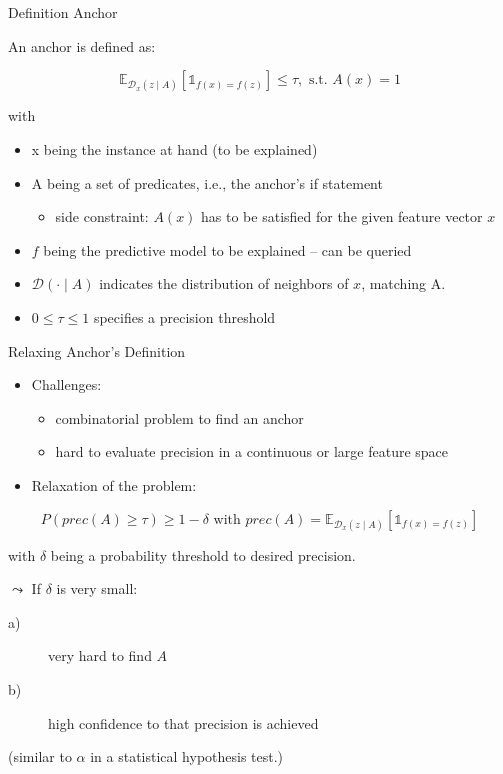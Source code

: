 \documentclass[aspectratio=169]{../latex_main/tntbeamer}  %
\begin{document}

\begin{frame}[c]{Definition Anchor}

An anchor is defined as:

\begin{equation}
    \mathbb{E}_{\mathcal{D}_x(z\mid A)} [\mathbb{1}_{f(x) = f(z)}] \leq \tau, \text{ s.t. } A(x) = 1
\end{equation}

with 

\begin{itemize}
    \item x being the instance at hand (to be explained)
    \item A being a set of predicates, i.e.,  the anchor's if statement
    \begin{itemize}
        \item side constraint: $A(x)$ has to be satisfied for the given feature vector $x$
    \end{itemize}
    \item $f$ being the predictive model to be explained -- can be queried
    \item $\mathcal{D}(\cdot \mid A)$ indicates the distribution of neighbors of $x$, matching A.
    \item $0 \leq \tau \leq 1$ specifies a precision threshold
\end{itemize}

\end{frame}


\begin{frame}[c]{Relaxing Anchor's Definition}

\begin{itemize}
    \item Challenges:
    \begin{itemize}
        \item combinatorial problem to find an anchor
        \item hard to evaluate precision in a continuous or large feature space
    \end{itemize}
    \item Relaxation of the problem:
\end{itemize}

$$P( prec(A) \geq \tau) \geq 1  - \delta \text{ with } prec(A)  = \mathbb{E}_{\mathcal{D}_x(z\mid A)} [\mathbb{1}_{f(x) = f(z)}] $$

with $\delta$ being a probability threshold to desired precision.

\pause
\medskip

$\leadsto$ If $\delta$ is very small:
\begin{description}
    \item[a)] very hard to find $A$
    \item[b)] high confidence to that precision is achieved
\end{description}
(similar to $\alpha$ in a statistical hypothesis test.)

\end{frame}
\end{document}
